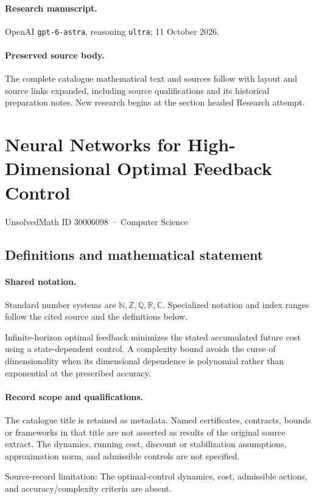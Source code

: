 \documentclass[11pt]{article}
\begin{document}
\paragraph{Research manuscript.} OpenAI \texttt{gpt-6-astra}, reasoning \texttt{ultra}; 11 October 2026.
\paragraph{Preserved source body.} The complete catalogue mathematical text and sources follow with layout and source links expanded, including source qualifications and its historical preparation notes. New research begins at the section headed Research attempt.

\section{Neural Networks for High-Dimensional Optimal Feedback Control}\label{30006098}
{\small UnsolvedMath ID 30006098 · Computer Science}
\subsection{Definitions and mathematical statement}

\paragraph{Shared notation.}Standard number systems are $\mathbb N,\mathbb Z,\mathbb Q,\mathbb R,\mathbb C$. Specialized notation and index ranges follow the cited source and the definitions below.


Infinite-horizon optimal feedback minimizes the stated accumulated future cost using a state-dependent control. A complexity bound avoids the curse of dimensionality when its dimensional dependence is polynomial rather than exponential at the prescribed accuracy.
\paragraph{Record scope and qualifications.}
The catalogue title is retained as metadata. Named certificates, contracts, bounds or frameworks in that title are not asserted as results of the original source extract.
The dynamics, running cost, discount or stabilization assumptions, approximation norm, and admissible controls are not specified.

Source-record limitation: The optimal-control dynamics, cost, admissible actions, and accuracy/complexity criteria are absent.
\end{document}
